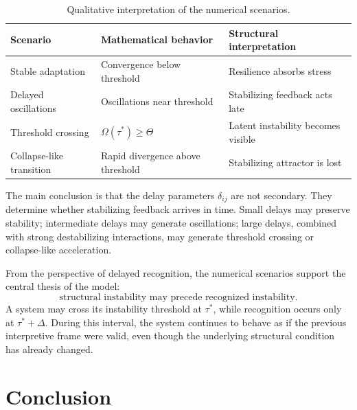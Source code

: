 \documentclass[11pt]{article}
\begin{document}
\begin{table}[h!]
	\centering
	\caption{Qualitative interpretation of the numerical scenarios.}
	\label{tab:scenario_summary}
	\begin{tabular}{lll}
		\toprule
		Scenario & Mathematical behavior & Structural interpretation \\
		\midrule
		Stable adaptation & Convergence below threshold & Resilience absorbs stress \\
		Delayed oscillations & Oscillations near threshold & Stabilizing feedback acts late \\
		Threshold crossing & \(\Omega(\tau^\ast)\geq\Theta\) & Latent instability becomes visible \\
		Collapse-like transition & Rapid divergence above threshold & Stabilizing attractor is lost \\
		\bottomrule
	\end{tabular}
\end{table}

The main conclusion is that the delay parameters \(\delta_{ij}\) are not secondary. They determine whether stabilizing feedback arrives in time. Small delays may preserve stability; intermediate delays may generate oscillations; large delays, combined with strong destabilizing interactions, may generate threshold crossing or collapse-like acceleration.

From the perspective of delayed recognition, the numerical scenarios support the central thesis of the model:
\[
\text{structural instability may precede recognized instability.}
\]
A system may cross its instability threshold at \(\tau^\ast\), while recognition occurs only at \(\tau^\ast+\Delta\). During this interval, the system continues to behave as if the previous interpretive frame were valid, even though the underlying structural condition has already changed.










\section{Conclusion}
\end{document}
